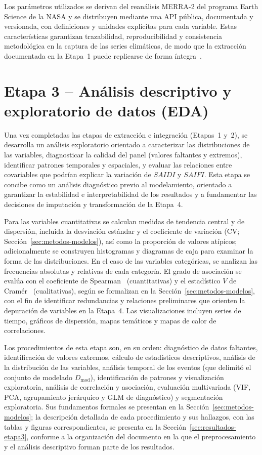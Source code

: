     Los parámetros utilizados se derivan del reanálisis MERRA-2 del programa Earth Science de la NASA y se distribuyen mediante una API pública, documentada y versionada, con definiciones y unidades explícitas para cada variable. Estas características garantizan trazabilidad, reproducibilidad y consistencia metodológica en la captura de las series climáticas, de modo que la extracción documentada en la Etapa~1 puede replicarse de forma íntegra~\cite{ref48}.
    

\section{Etapa 3 – Análisis descriptivo y exploratorio de datos (EDA)}
\label{sec:metodología-etapa3}

Una vez completadas las etapas de extracción e integración (Etapas~1 y~2), se desarrolla un análisis exploratorio orientado a caracterizar las distribuciones de las variables, diagnosticar la calidad del panel (valores faltantes y extremos), identificar patrones temporales y espaciales, y evaluar las relaciones entre covariables que podrían explicar la variación de $SAIDI$ y $SAIFI$. Esta etapa se concibe como un análisis diagnóstico previo al modelamiento, orientado a garantizar la estabilidad e interpretabilidad de los resultados y a fundamentar las decisiones de imputación y transformación de la Etapa~4.

Para las variables cuantitativas se calculan medidas de tendencia central y de dispersión, incluida la desviación estándar y el coeficiente de variación (CV; Sección~\ref{sec:metodos-modelos}), así como la proporción de valores atípicos; adicionalmente se construyen histogramas y diagramas de caja para examinar la forma de las distribuciones. En el caso de las variables categóricas, se analizan las frecuencias absolutas y relativas de cada categoría. El grado de asociación se evalúa con el coeficiente de Spearman~\textcite{ref53} (cuantitativas) y el estadístico $V$ de Cramér~\textcite{ref54} (cualitativas), según se formalizan en la Sección~\ref{sec:metodos-modelos}, con el fin de identificar redundancias y relaciones preliminares que orienten la depuración de variables en la Etapa~4. Las visualizaciones incluyen series de tiempo, gráficos de dispersión, mapas temáticos y mapas de calor de correlaciones.

Los procedimientos de esta etapa son, en su orden: diagnóstico de datos faltantes, identificación de valores extremos, cálculo de estadísticos descriptivos, análisis de la distribución de las variables, análisis temporal de los eventos (que delimitó el conjunto de modelado $D_{\mathrm{mod}}$), identificación de patrones y visualización exploratoria, análisis de correlación y asociación, evaluación multivariada (VIF, PCA, agrupamiento jerárquico y GLM de diagnóstico) y segmentación exploratoria. Sus fundamentos formales se presentan en la Sección~\ref{sec:metodos-modelos}; la descripción detallada de cada procedimiento y sus hallazgos, con las tablas y figuras correspondientes, se presenta en la Sección~\ref{sec:resultados-etapa3}, conforme a la organización del documento en la que el preprocesamiento y el análisis descriptivo forman parte de los resultados.

